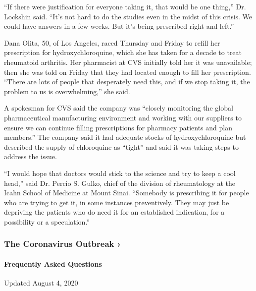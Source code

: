 ``If there were justification for everyone taking it, that would be one
thing,'' Dr. Lockshin said. ``It's not hard to do the studies even in
the midst of this crisis. We could have answers in a few weeks. But it's
being prescribed right and left.''

Dana Olita, 50, of Los Angeles, raced Thursday and Friday to refill her
prescription for hydroxychloroquine, which she has taken for a decade to
treat rheumatoid arthritis. Her pharmacist at CVS initially told her it
was unavailable; then she was told on Friday that they had located
enough to fill her prescription. ``There are lots of people that
desperately need this, and if we stop taking it, the problem to us is
overwhelming,'' she said.

A spokesman for CVS said the company was ``closely monitoring the global
pharmaceutical manufacturing environment and working with our suppliers
to ensure we can continue filling prescriptions for pharmacy patients
and plan members.'' The company said it had adequate stocks of
hydroxychloroquine but described the supply of chloroquine as ``tight''
and said it was taking steps to address the issue.

``I would hope that doctors would stick to the science and try to keep a
cool head,'' said Dr. Percio S. Gulko, chief of the division of
rheumatology at the Icahn School of Medicine at Mount Sinai. ``Somebody
is prescribing it for people who are trying to get it, in some instances
preventively. They may just be depriving the patients who do need it for
an established indication, for a possibility or a speculation.''

\href{https://www.nytimes3xbfgragh.onion/news-event/coronavirus?action=click\&pgtype=Article\&state=default\&region=MAIN_CONTENT_3\&context=storylines_faq}{}

\hypertarget{the-coronavirus-outbreak-}{%
\subsubsection{The Coronavirus Outbreak
›}\label{the-coronavirus-outbreak-}}

\hypertarget{frequently-asked-questions}{%
\paragraph{Frequently Asked
Questions}\label{frequently-asked-questions}}

Updated August 4, 2020

